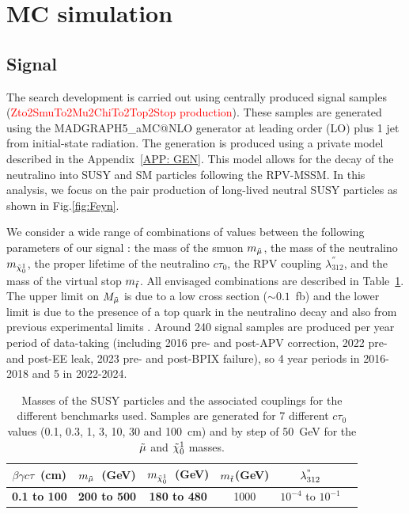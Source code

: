 \documentclass{cernatlasnote}
\begin{document}
\section{MC simulation}
\label{SEC: MC}

\subsection{Signal}
The search development is carried out using centrally produced signal samples (\textcolor{red}{\mbox Zto2SmuTo2Mu2ChiTo2Top2Stop production}). These samples are generated using the MADGRAPH5\_aMC@NLO generator \cite{MAD} at leading order (LO) plus 1 jet from initial-state radiation. The generation is produced using a private model described in the Appendix~\ref{APP: GEN}. This model allows for the decay of the neutralino into SUSY and SM particles following the RPV-MSSM. In this analysis, we focus on the pair production of long-lived neutral SUSY particles as shown in Fig.\ref{fig:Feyn}.

We consider a wide range of combinations of values between the following parameters of our signal :
the mass of the smuon $m_{\Tilde{\mu}}$, the mass of the neutralino $m_{\Tilde{\chi}_{0}^{1}}$, the proper lifetime of the neutralino $c\tau_{0}$, the RPV coupling $\lambda^{''}_{312}$, and the mass of the virtual stop $m_{\Tilde{t}}$. All envisaged combinations are described in Table~\ref{tab:TAB1}. The upper limit on $M_{\Tilde{\mu}}$ is due to a low cross section ($\sim 0.1$~fb) and the lower limit is due to the presence of a top quark in the neutralino decay and also from previous experimental limits \cite{ATLAS1,ATLAS2,ATLAS3,CMS1,ATLAS4,CMS2,ATLAS5}. 
Around 240 signal samples are produced per year period of data-taking (including 2016 pre- and post-APV correction, 2022 pre- and post-EE leak, 2023 pre- and post-BPIX failure), so 4 year periods in 2016-2018 and 5 in 2022-2024.

\begin{table}[h]
\centering
\begin{tabular}{|c|c|c|c|c|c|}
  \hline
  $\beta\gamma c\tau$~(cm) & $m_{\Tilde{\mu}}$~(GeV) &  $m_{\Tilde{\chi}_{0}^{1}}$~(GeV) &  $m_{\Tilde{t}}$(GeV) &  $\lambda^{"}_{312}$ \\
  \hline
\textbf{0.1 to 100} & \textbf{200 to 500}  & \textbf{180 to 480}  & 1000 &  $10^{-4}$ to $10^{-1}$\\
  \hline
\end{tabular}
    \caption{Masses of the SUSY particles and the associated couplings for the different benchmarks used. Samples are generated for 7 different $c\tau_{0}$ values (0.1, 0.3, 1, 3, 10, 30 and 100~cm) and by step of 50~GeV for the $\Tilde{\mu}$ and $\Tilde{\chi}_{0}^{1}$ masses.}
    \label{tab:TAB1}
\end{table}
\end{document}
